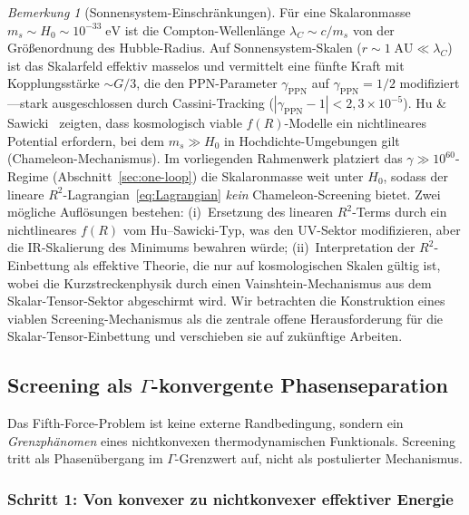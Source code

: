 \documentclass[12pt,a4paper]{article}
\theoremstyle{definition}
\theoremstyle{plain}
\theoremstyle{remark}
\newtheorem{remark}[definition]{Bemerkung}
\begin{document}
\begin{remark}[Sonnensystem-Einschr\"ankungen]\label{sec:screening}
F\"ur eine Skalaronmasse $m_{s} \sim H_{0} \sim 10^{-33}\;\mathrm{eV}$
ist die Compton-Wellenl\"ange $\lambda_{C} \sim c/m_{s}$ von der
Gr\"o\ss enordnung des Hubble-Radius. Auf Sonnensystem-Skalen
($r \sim 1\;\mathrm{AU} \ll \lambda_{C}$) ist das Skalarfeld effektiv
masselos und vermittelt eine f\"unfte Kraft mit Kopplungsst\"arke
$\sim G/3$, die den PPN-Parameter $\gamma_{\mathrm{PPN}}$ auf
$\gamma_{\mathrm{PPN}} = 1/2$ modifiziert---stark ausgeschlossen
durch Cassini-Tracking
($|\gamma_{\mathrm{PPN}} - 1| < 2{,}3 \times 10^{-5}$).
Hu \& Sawicki~\cite{HuSawicki2007} zeigten, dass kosmologisch
viable $f(R)$-Modelle ein nichtlineares Potential erfordern, bei dem
$m_s \gg H_0$ in Hochdichte-Umgebungen gilt (Chameleon-Mechanismus).
Im vorliegenden Rahmenwerk platziert das
$\gamma \gg 10^{60}$-Regime (Abschnitt~\ref{sec:one-loop}) die
Skalaronmasse weit unter $H_{0}$, sodass der lineare
$R^2$-Lagrangian~\eqref{eq:Lagrangian} \emph{kein}
Chameleon-Screening bietet. Zwei m\"ogliche Aufl\"osungen bestehen:
(i)~Ersetzung des linearen $R^2$-Terms durch ein nichtlineares $f(R)$
vom Hu--Sawicki-Typ, was den UV-Sektor modifizieren, aber die
IR-Skalierung des Minimums bewahren w\"urde;
(ii)~Interpretation der $R^2$-Einbettung als
effektive Theorie, die nur auf kosmologischen Skalen g\"ultig ist,
wobei die Kurzstreckenphysik durch einen Vainshtein-Mechanismus aus
dem Skalar-Tensor-Sektor abgeschirmt wird.
Wir betrachten die Konstruktion eines viablen Screening-Mechanismus
als die zentrale offene Herausforderung f\"ur die
Skalar-Tensor-Einbettung und verschieben sie auf zuk\"unftige
Arbeiten.
\end{remark}

\subsection{Screening als $\Gamma$-konvergente Phasenseparation}\label{sec:screening-gamma}

Das Fifth-Force-Problem ist keine externe Randbedingung, sondern ein \emph{Grenzph\"anomen} eines nichtkonvexen thermodynamischen Funktionals. Screening tritt als Phasen\"ubergang im $\Gamma$-Grenzwert auf, nicht als postulierter Mechanismus.

\subsubsection*{Schritt 1: Von konvexer zu nichtkonvexer effektiver Energie}
\end{document}
